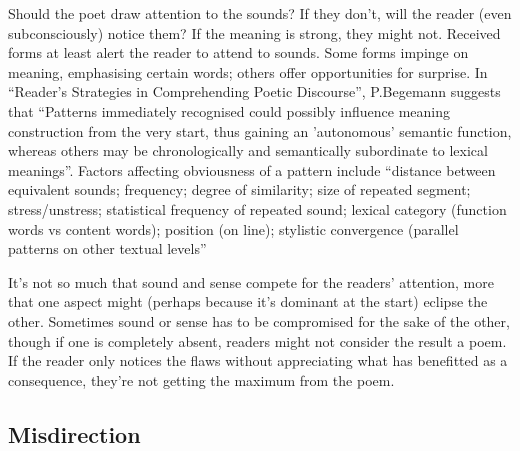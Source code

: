 \documentclass[11pt]{article}
\begin{document}
Should the poet draw attention to the sounds? If they don't, will the reader (even subconsciously) notice them? If the meaning is strong, they might not. Received forms at least alert the reader to attend to sounds. Some forms impinge on meaning, emphasising certain words; others offer opportunities for surprise. In ``Reader's Strategies in Comprehending Poetic Discourse'', P.Begemann suggests that ``Patterns immediately recognised could possibly influence meaning construction from the very start, thus gaining an 'autonomous' semantic function, whereas others may be chronologically and semantically subordinate to lexical meanings''. Factors affecting obviousness of a pattern include ``distance between equivalent sounds; frequency; degree of similarity; size of repeated segment; stress/unstress; statistical frequency of repeated sound; lexical category (function words vs content words); position (on line); stylistic convergence (parallel patterns on other textual levels''

It's not so much that sound and sense compete for the readers' attention, more that one aspect might (perhaps because it's dominant at the start) eclipse the other. Sometimes sound or sense has to be compromised for the sake of the other, though if one is completely absent, readers might not consider the result a poem. If the reader only notices the flaws without appreciating what has benefitted as a consequence, they're not getting the maximum from the poem.


\newpage\subsection{Misdirection}
\end{document}
